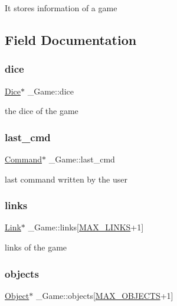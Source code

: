 It stores information of a game 

\subsection{Field Documentation}
\mbox{\label{struct__Game_af7004361a877182511a3e501b0949220}} 
\subsubsection{\texorpdfstring{dice}{dice}}
{\footnotesize\ttfamily \hyperlink{dice_8h_a5910ae86cf402855269700abd23e3976}{Dice}$\ast$ \+\_\+\+Game\+::dice}

the dice of the game \mbox{\label{struct__Game_a47afef4b632256566d81da0f50e7a380}} 
\subsubsection{\texorpdfstring{last\+\_\+cmd}{last\_cmd}}
{\footnotesize\ttfamily \hyperlink{command_8h_a7d2935971c252377cb0fc1c8545dc2bc}{Command}$\ast$ \+\_\+\+Game\+::last\+\_\+cmd}

last command written by the user \mbox{\label{struct__Game_a672f97aff892c65a6fdb43665cb57c97}} 
\subsubsection{\texorpdfstring{links}{links}}
{\footnotesize\ttfamily \hyperlink{link_8h_ae3b299941e67be6971bfd64a25505eff}{Link}$\ast$ \+\_\+\+Game\+::links\mbox{[}\hyperlink{game_8h_a660ed1ec8604982002a0d6eced0e0367}{M\+A\+X\+\_\+\+L\+I\+N\+KS}+1\mbox{]}}

links of the game \mbox{\label{struct__Game_aa669bb857944c6c3b53504d179640af0}} 
\subsubsection{\texorpdfstring{objects}{objects}}
{\footnotesize\ttfamily \hyperlink{object_8h_a7f8bbcda919b65ce67f92fba08e0212f}{Object}$\ast$ \+\_\+\+Game\+::objects\mbox{[}\hyperlink{game_8h_acdc7844fbd4d45737d4aa56834d37829}{M\+A\+X\+\_\+\+O\+B\+J\+E\+C\+TS}+1\mbox{]}}

